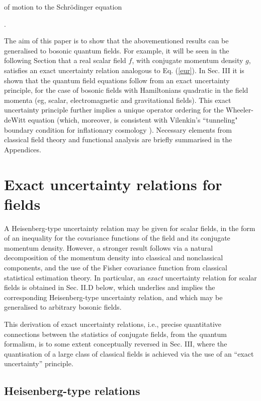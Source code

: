 \documentclass[a4paper,preprint, showpacs, aps, draft]{revtex4}
\begin{document}
of motion to the Schr\"{o}dinger equation {\cite{hallreg, bamberg}. 

The aim of this paper is to show that the abovementioned results
can be generalised to bosonic quantum fields.  For
example, it will be seen in the following Section 
that a real scalar field $f$, with conjugate
momentum density $g$, satisfies an exact uncertainty relation 
analogous to Eq. (\ref{eur}).  In Sec. III 
it is shown that the
quantum field equations follow from an exact uncertainty principle, for
the case of bosonic fields with Hamiltonians quadratic in the field
momenta (eg, scalar, electromagnetic and gravitational fields).  This
exact uncertainty principle further implies a unique operator ordering
for the Wheeler-deWitt equation (which, moreover, is consistent with
Vilenkin's ``tunneling" boundary condition for inflationary cosmology
\cite {vilenkin}).  Necessary elements from
classical field theory and functional analysis are briefly summarised in
the Appendices.
 
\section{Exact uncertainty relations for fields}

A Heisenberg-type uncertainty relation  may be given 
for scalar fields, in the form of
an inequality for the covariance functions of the
field and its conjugate momentum density.  However, a stronger result
follows via a natural
decomposition of the momentum density into classical and nonclassical
components, and the use of the Fisher covariance function from classical
statistical estimation theory.  In particular,
an {\it exact} uncertainty relation for scalar fields is obtained in
Sec. II.D below, which underlies and implies the corresponding Heisenberg-type
uncertainty relation, and which may be generalised to arbitrary bosonic
fields. 

This derivation of exact uncertainty relations,
i.e., precise quantitative connections between the statistics of
conjugate fields, from the quantum formalism, is to some extent
conceptually reversed in Sec. III, where the quantisation of a large
class of classical fields is achieved via the use of an ``exact
uncertainty'' principle. 

\subsection{Heisenberg-type relations}

}
\end{document}
